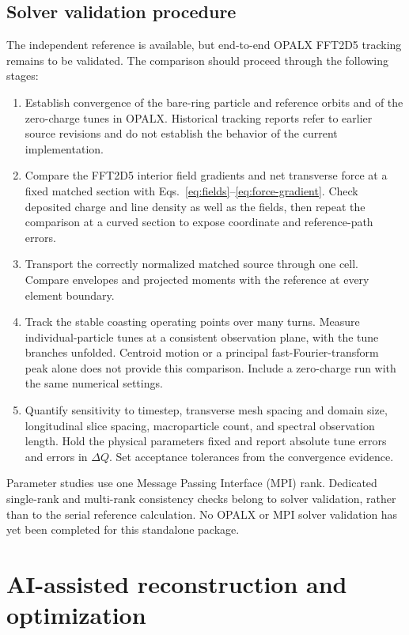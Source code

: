 \documentclass[11pt,a4paper]{article}
\numberwithin{equation}{section}
\begin{document}
\subsection{Solver validation procedure}

The independent reference is available, but end-to-end OPALX FFT2D5
tracking remains to be validated. The comparison should proceed through
the following stages:
\begin{enumerate}[label=(\roman*)]
  \item Establish convergence of the bare-ring particle and reference
  orbits and of the zero-charge tunes in OPALX. Historical tracking
  reports refer to earlier source revisions and do not establish the
  behavior of the current implementation.
  \item Compare the FFT2D5 interior field gradients and net transverse
  force at a fixed matched section with Eqs.~\eqref{eq:fields}--\eqref{eq:force-gradient}.
  Check deposited charge and line density as well as the fields, then
  repeat the comparison at a curved section to expose coordinate and
  reference-path errors.
  \item Transport the correctly normalized matched source through one
  cell. Compare envelopes and projected moments with the reference at
  every element boundary.
  \item Track the stable coasting operating points over many turns.
  Measure individual-particle tunes at a consistent observation plane,
  with the tune branches unfolded. Centroid motion or a principal
  fast-Fourier-transform peak alone does not provide this comparison.
  Include a zero-charge run with the same numerical settings.
  \item Quantify sensitivity to timestep, transverse mesh spacing and
  domain size, longitudinal slice spacing, macroparticle count, and
  spectral observation length. Hold the physical parameters fixed and
  report absolute tune errors and errors in $\Delta Q$. Set acceptance tolerances
  from the convergence evidence.
\end{enumerate}
Parameter studies use one Message Passing Interface (MPI) rank. Dedicated
single-rank and multi-rank consistency checks belong to solver validation,
rather than to the serial reference calculation. No OPALX or MPI solver
validation has yet been completed for this standalone package.

\section{AI-assisted reconstruction and optimization}
\label{sec:design}
\end{document}
